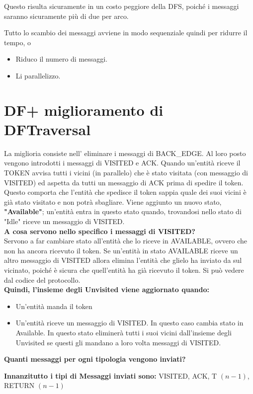 Questo risulta sicuramente in un costo peggiore della DFS, poiché i messaggi
saranno sicuramente più di due per arco.

Tutto lo scambio dei messaggi avviene in modo sequenziale quindi per ridurre il
tempo, o
\begin{itemize}
    \item Riduco il numero di messaggi.
    \item Li parallelizzo.
\end{itemize}

\section{DF+ miglioramento di DFTraversal}
La miglioria consiste nell' eliminare i messaggi di BACK\_EDGE. Al loro posto
vengono introdotti i messaggi di VISITED e ACK. Quando un'entità riceve il TOKEN
avvisa tutti i vicini (in parallelo) che è stato visitata (con messaggio di
VISITED) ed aspetta da tutti un messaggio di ACK prima di spedire il token.
Questo comporta che l'entità che spedisce il token sappia quale dei suoi vicini
è già stato visitato e non potrà sbagliare. Viene aggiunto un nuovo stato,
\textbf{"Available"}; un'entità entra in questo stato quando, trovandosi nello
stato di "Idle" riceve un messaggio di VISITED.\\

\textbf{A cosa servono nello specifico i messaggi di VISITED?}\\
Servono a far cambiare stato all'entità che lo riceve in AVAILABLE, ovvero che
non ha ancora ricevuto il token. Se un'entità in stato AVAILABLE riceve un altro
messaggio di VISITED allora elimina l'entità che glielo ha inviato da sul
vicinato, poiché è sicura che quell'entità ha già ricevuto il token. Si può
vedere dal codice del protocollo.\\
\textbf{Quindi, l'insieme degli Unvisited viene aggiornato quando:}
\begin{itemize}
    \item Un'entità manda il token
    \item Un'entità riceve un messaggio di VISITED. In questo caso cambia stato in
          Available. In questo stato eliminerà tutti i suoi vicini dall'insieme degli
          Unvisited se questi gli mandano a loro volta messaggi di VISITED.
\end{itemize}

\textbf{Quanti messaggi per ogni tipologia vengono inviati?}

\textbf{Innanzitutto i tipi di Messaggi inviati sono:} VISITED, ACK, T $(n-1)$,
RETURN $(n-1)$

